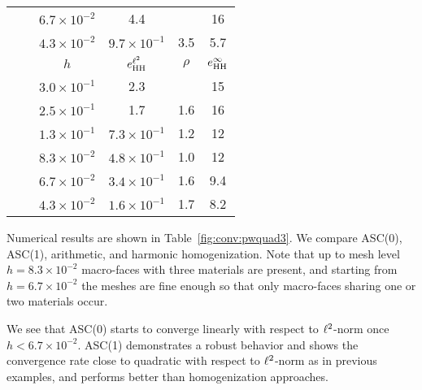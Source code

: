 \begin{table}[h]
\begin{tabular}[1.1]{c | c | c || c | c || c |}
	    \cline{3-6}
	    & & {$6.7\times10^{-2}$} & 4.4 & & 16 \\
	    \cline{3-6}
	    & & $4.3\times10^{-2}$ & $9.7\times10^{-1}$ & 3.5 & 5.7 \\
	    \hhline{~=====}
	    & \multirow{7}{*}{\rotatebox{90}{Harmonic}} & $h$ & $e^{{\ell^2}}_{\text{HH}}$ & $\rho$ & $e^{\infty}_{\text{HH}}$ \\
	    \cline{3-6}
	    & & $3.0\times10^{-1}$ & 2.3 & & 15 \\
	    \cline{3-6}
	    & & $2.5\times10^{-1}$ & 1.7 & 1.6 & 16 \\
	    \cline{3-6}
	    & & $1.3\times10^{-1}$ & $7.3\times10^{-1}$ & 1.2 & 12 \\
	    \cline{3-6}
	    & & $8.3\times10^{-2}$ & $4.8\times10^{-1}$ & 1.0 & 12 \\
	    \cline{3-6}
	    & & $6.7\times10^{-2}$ & $3.4\times10^{-1}$ & 1.6 & 9.4 \\
	    \cline{3-6}
	    & & $4.3\times10^{-2}$ & $1.6\times10^{-1}$ & 1.7 & 8.2 \\
	    \cline{2-6}
	  \end{tabular}
\end{table}
	
Numerical results are shown in Table~\ref{fig:conv:pwquad3}. We compare ASC(0), ASC(1), arithmetic, and harmonic homogenization. Note that up to mesh level~$h = 8.3\times10^{-2}$ macro-faces with three materials are present, and starting from {$h = 6.7\times10^{-2}$} the meshes are fine enough so that only macro-faces sharing one or two materials occur.
	
We see that ASC(0) starts to converge linearly with respect to ${\ell^2}$-norm once~$h < 6.7\times10^{-2}$. ASC(1) demonstrates a robust behavior and shows the convergence rate close to quadratic with respect to ${\ell^2}$-norm as in previous examples, and performs better than homogenization approaches.

